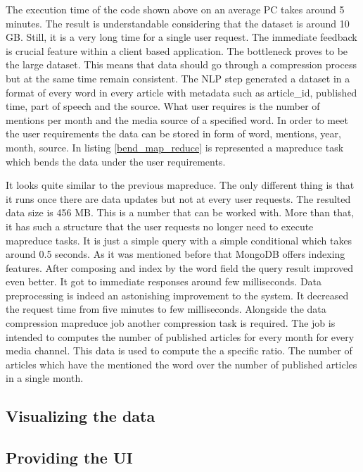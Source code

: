 

The execution time of the code shown above on an average PC takes around 5 minutes. The result is understandable considering that the dataset is around 10 GB. Still, it is a very long time for a single user request. The immediate feedback is crucial feature within a client based application. The bottleneck proves to be the large dataset. This means that data should go through a compression process but at the same time remain consistent. The NLP step generated a dataset in a format of every word in every article with metadata such as article\_id, published time, part of speech and the source. What user requires is the number of mentions per month and the media source of a specified word. In order to meet the user requirements the data can be stored in form of  {word, mentions, year, month, source}. In listing \ref{bend_map_reduce} is represented a mapreduce task which bends the data under the user requirements.



It looks quite similar to the previous mapreduce. The only different thing is that it runs once there are data updates but not at every user requests. The resulted data size is 456 MB. This is a number that can be worked with. More than that, it has such a structure that the user requests no longer need to execute mapreduce tasks. It is just a simple query with a simple conditional which takes around 0.5 seconds. As it was mentioned before that MongoDB offers indexing features. After composing and index by the word field the query result improved even better. It got to immediate responses around few milliseconds. Data preprocessing is indeed an astonishing improvement to the system. It decreased the request time from five minutes to few milliseconds. Alongside the data compression mapreduce job another compression task is required. The job is intended to computes the number of published articles for every month for every media channel. This data is used to compute the a specific ratio. The number of articles which have the mentioned the word over the number of published articles in a single month.

\subsection{Visualizing the data}
\subsection{Providing the UI}

\clearpage
